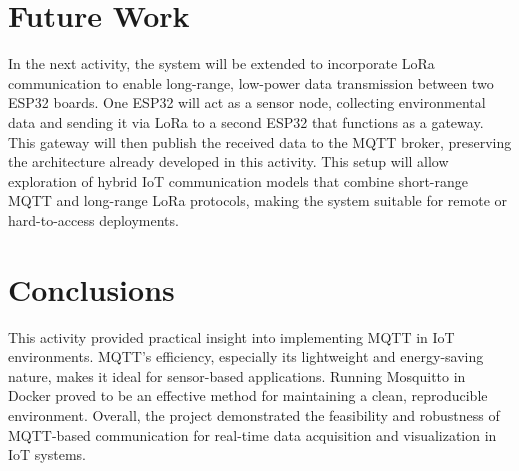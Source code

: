 \documentclass[a4paper,12pt]{article}
\begin{document}
\newpage

\section{Future Work}

In the next activity, the system will be extended to incorporate LoRa communication to enable long-range, low-power data transmission between two ESP32 boards. One ESP32 will act as a sensor node, collecting environmental data and sending it via LoRa to a second ESP32 that functions as a gateway. This gateway will then publish the received data to the MQTT broker, preserving the architecture already developed in this activity. This setup will allow exploration of hybrid IoT communication models that combine short-range MQTT and long-range LoRa protocols, making the system suitable for remote or hard-to-access deployments.

\section{Conclusions}
This activity provided practical insight into implementing MQTT in IoT environments. MQTT's efficiency, especially its lightweight and energy-saving nature, makes it ideal for sensor-based applications. Running Mosquitto in Docker proved to be an effective method for maintaining a clean, reproducible environment. Overall, the project demonstrated the feasibility and robustness of MQTT-based communication for real-time data acquisition and visualization in IoT systems.
\end{document}
